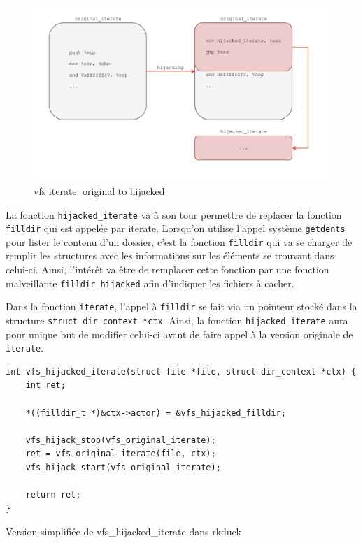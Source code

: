 \documentclass[12pt]{article}
\begin{document}
\begin{figure}[H] 
\begin{center}
\includegraphics[scale=0.4]{./img/vfs_iterate_original_to_hijacked.png}

\caption[dsfsdf]{vfs iterate: original to hijacked}
\label{figure:1}
\end{center}
\end{figure}

		La fonction \texttt{hijacked\_iterate} va à son tour permettre de replacer la fonction \texttt{filldir} qui est appelée par iterate. Lorsqu'on utilise l'appel système \texttt{getdents} pour lister le contenu d'un dossier, c'est la fonction \texttt{filldir} qui va se charger de remplir les structures avec les informations sur les éléments se trouvant dans celui-ci. Ainsi, l'intérêt va être de remplacer cette fonction par une fonction malveillante \texttt{filldir\_hijacked} afin d'indiquer les fichiers à cacher.

        Dans la fonction \texttt{iterate}, l'appel à \texttt{filldir} se fait via un pointeur stocké dans la structure \texttt{struct dir\_context *ctx}. Ainsi, la fonction \texttt{hijacked\_iterate} aura pour unique but de modifier celui-ci avant de faire appel à la version originale de \texttt{iterate}.\\

\begin{listing}[H]
\begin{verbatim}
int vfs_hijacked_iterate(struct file *file, struct dir_context *ctx) {
    int ret;

    *((filldir_t *)&ctx->actor) = &vfs_hijacked_filldir;

    vfs_hijack_stop(vfs_original_iterate);
    ret = vfs_original_iterate(file, ctx);
    vfs_hijack_start(vfs_original_iterate);

    return ret;
}
\end{verbatim}
\caption{Version simplifiée de vfs\_hijacked\_iterate dans rkduck}
\label{listing:7}
\end{listing}
\end{document}
